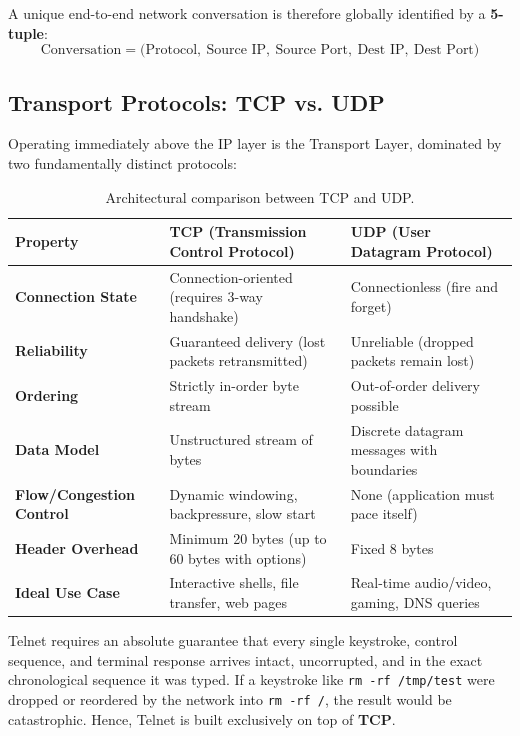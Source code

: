 A unique end-to-end network conversation is therefore globally identified by a \textbf{5-tuple}:
\begin{equation}
\label{eq:5tuple}
\text{Conversation} = \Big(\text{Protocol},~\text{Source IP},~\text{Source Port},~\text{Dest IP},~\text{Dest Port}\Big)
\end{equation}

\subsection{Transport Protocols: TCP vs. UDP}

Operating immediately above the IP layer is the Transport Layer, dominated by two fundamentally distinct protocols:

\begin{table}[htbp]
\centering
\small
\begin{tabular}{@{}lll@{}}
\toprule
\textbf{Property} & \textbf{TCP (Transmission Control Protocol)} & \textbf{UDP (User Datagram Protocol)} \\
\midrule
\textbf{Connection State} & Connection-oriented (requires 3-way handshake) & Connectionless (fire and forget) \\
\textbf{Reliability} & Guaranteed delivery (lost packets retransmitted) & Unreliable (dropped packets remain lost) \\
\textbf{Ordering} & Strictly in-order byte stream & Out-of-order delivery possible \\
\textbf{Data Model} & Unstructured stream of bytes & Discrete datagram messages with boundaries \\
\textbf{Flow/Congestion Control} & Dynamic windowing, backpressure, slow start & None (application must pace itself) \\
\textbf{Header Overhead} & Minimum 20 bytes (up to 60 bytes with options) & Fixed 8 bytes \\
\textbf{Ideal Use Case} & Interactive shells, file transfer, web pages & Real-time audio/video, gaming, DNS queries \\
\bottomrule
\end{tabular}
\caption{Architectural comparison between TCP and UDP.}
\label{tab:tcp_vs_udp}
\end{table}

Telnet requires an absolute guarantee that every single keystroke, control sequence, and terminal response arrives intact, uncorrupted, and in the exact chronological sequence it was typed. If a keystroke like \texttt{rm -rf /tmp/test} were dropped or reordered by the network into \texttt{rm -rf /}, the result would be catastrophic. Hence, Telnet is built exclusively on top of \textbf{TCP}.

